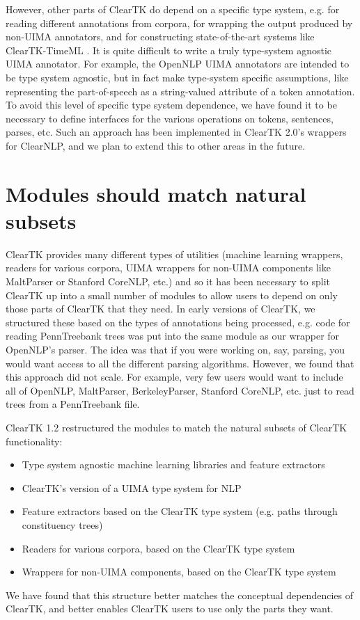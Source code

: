 \documentclass[10pt, a4paper]{article}
\begin{document}
However, other parts of ClearTK do depend on a specific type system, e.g. for reading different annotations from corpora, for wrapping the output produced by non-UIMA annotators, and for constructing state-of-the-art systems like ClearTK-TimeML \cite{bethard:2013:SemEval-2013}.
It is quite difficult to write a truly type-system agnostic UIMA annotator.
For example, the OpenNLP UIMA annotators are intended to be type system agnostic, but in fact make type-system specific assumptions, like representing the part-of-speech as a string-valued attribute of a token annotation.
To avoid this level of specific type system dependence, we have found it to be necessary to define interfaces for the various operations on tokens, sentences, parses, etc.
Such an approach has been implemented in ClearTK 2.0's wrappers for ClearNLP, and we plan to extend this to other areas in the future.


\section{Modules should match natural subsets}
ClearTK provides many different types of utilities (machine learning wrappers, readers for various corpora, UIMA wrappers for non-UIMA components like MaltParser or Stanford CoreNLP, etc.) and so it has been necessary to split ClearTK up into a small number of modules to allow users to depend on only those parts of ClearTK that they need.
In early versions of ClearTK, we structured these based on the types of annotations being processed, e.g. code for reading PennTreebank trees was put into the same module as our wrapper for OpenNLP's parser.
The idea was that if you were working on, say, parsing, you would want access to all the different parsing algorithms.
However, we found that this approach did not scale.
For example, very few users would want to include all of OpenNLP, MaltParser, BerkeleyParser, Stanford CoreNLP, etc. just to read trees from a PennTreebank file.

ClearTK 1.2 restructured the modules to match the natural subsets of ClearTK functionality:
\begin{itemize}
\item Type system agnostic machine learning libraries and feature extractors 
\item ClearTK's version of a UIMA type system for NLP
\item Feature extractors based on the ClearTK type system (e.g. paths through constituency trees)
\item Readers for various corpora, based on the ClearTK type system
\item Wrappers for non-UIMA components, based on the ClearTK type system
\end{itemize}
We have found that this structure better matches the conceptual dependencies of ClearTK, and better enables ClearTK users to use only the parts they want.
\end{document}
